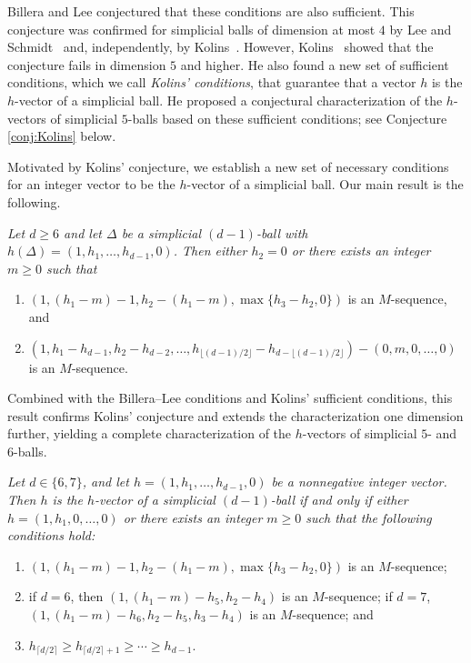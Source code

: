\documentclass[11pt]{article}
\newenvironment{numtheorem}[1]{\medskip\noindent {\bf Theorem~#1.}\em}{}
\theoremstyle{definition}
\numberwithin{equation}{theorem}
\begin{document}
Billera and Lee conjectured that these conditions are also sufficient. This conjecture was confirmed for simplicial balls of dimension at most $4$ by Lee and Schmidt~\cite{LeeSchmidt2011} and, independently, by Kolins~\cite{Kolins2011}. However, Kolins~\cite{Kolins2011} showed that the conjecture fails in dimension $5$ and higher. He also found a new set of sufficient conditions, which we call \emph{Kolins' conditions}, that guarantee that a vector $h$ is the $h$-vector of a simplicial ball.
He proposed a conjectural characterization of the $h$-vectors of simplicial $5$-balls based on these sufficient conditions;
see Conjecture \ref{conj:Kolins} below.

Motivated by Kolins' conjecture, we establish a new set of necessary conditions for an integer vector to be the $h$-vector of a simplicial ball. Our main result is the following.

\begin{numtheorem}{\ref{thm:main}}
Let $d\geq 6$ and let $\Delta$ be a simplicial $(d-1)$-ball with $h(\Delta)=(1,h_1,\dots, h_{d-1},0)$. Then either $h_2=0$ or there exists an integer $m \geq 0$ such that
\begin{enumerate}
\item $(1, (h_1-m)-1, h_2-(h_1-m), \max\{h_3-h_2, 0\})$ is an $M$-sequence, and
\item $(1, h_1-h_{d-1}, h_2-h_{d-2}, \ldots, h_{\lfloor (d-1)/2 \rfloor}-h_{d-\lfloor (d-1)/2 \rfloor})-(0,m,0,\dots,0)$ is an $M$-sequence.
\end{enumerate}
\end{numtheorem}


Combined with the Billera–Lee conditions and Kolins’ sufficient conditions, this result confirms Kolins’ conjecture and extends the characterization one dimension further, yielding a complete characterization of the $h$-vectors of simplicial $5$- and $6$-balls.

\begin{numtheorem}{\ref{thm:5-and-6-balls}}
Let $d\in\{6,7\}$, and let $h=(1,h_1,\ldots,h_{d-1},0)$ be a nonnegative integer vector. Then $h$ is the $h$-vector of a simplicial $(d-1)$-ball if and only if
either $h=(1,h_1,0,\dots,0)$ or there exists an integer $m\geq 0$ such that the following conditions hold:
\begin{enumerate}
\item $(1, (h_1-m)-1, h_2-(h_1-m), \max\{h_{3} - h_{2},0\})$ is an $M$-sequence;
\item if $d=6$, then  $(1, (h_1-m)-h_{5}, h_2-h_4)$ is an $M$-sequence; if $d=7$, $(1, (h_1-m)-h_{6}, h_2-h_{5},h_3-h_4)$ is an $M$-sequence; and
\item $h_{\lceil d/2 \rceil} \geq h_{\lceil d/2 \rceil +1} \geq \cdots \geq h_{d-1}$.
\end{enumerate}
\end{numtheorem}
\end{document}
